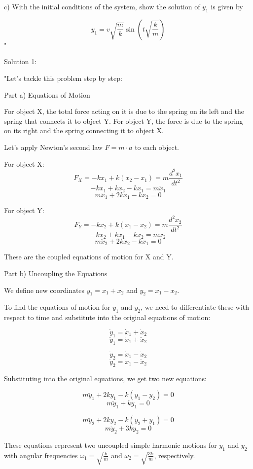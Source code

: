 c) With the initial conditions of the system, show the solution of \( y_{1} \) is given by 
    
\[
y_{1} = v \sqrt{\frac{m}{k}} \sin(t \sqrt{\frac{k}{m}})
\]"

Solution 1:

"Let's tackle this problem step by step:

Part a) Equations of Motion

For object X, the total force acting on it is due to the spring on its left and the spring that connects it to object Y. For object Y, the force is due to the spring on its right and the spring connecting it to object X. 

Let's apply Newton's second law \( F = m \cdot a \) to each object.

For object X:
\[ F_{X} = -kx_{1} + k(x_{2} - x_{1}) = m \frac{d^{2}x_{1}}{dt^{2}} \]
\[ -kx_{1} + kx_{2} - kx_{1} = m \ddot{x}_{1} \]
\[ m \ddot{x}_{1} + 2kx_{1} - kx_{2} = 0 \]

For object Y:
\[ F_{Y} = -kx_{2} + k(x_{1} - x_{2}) = m \frac{d^{2}x_{2}}{dt^{2}} \]
\[ -kx_{2} + kx_{1} - kx_{2} = m \ddot{x}_{2} \]
\[ m \ddot{x}_{2} + 2kx_{2} - kx_{1} = 0 \]

These are the coupled equations of motion for X and Y.

Part b) Uncoupling the Equations

We define new coordinates \( y_{1} = x_{1} + x_{2} \) and \( y_{2} = x_{1} - x_{2} \).

To find the equations of motion for \( y_{1} \) and \( y_{2} \), we need to differentiate these with respect to time and substitute into the original equations of motion:

\[ \dot{y}_{1} = \dot{x}_{1} + \dot{x}_{2} \]
\[ \ddot{y}_{1} = \ddot{x}_{1} + \ddot{x}_{2} \]

\[ \dot{y}_{2} = \dot{x}_{1} - \dot{x}_{2} \]
\[ \ddot{y}_{2} = \ddot{x}_{1} - \ddot{x}_{2} \]

Substituting into the original equations, we get two new equations:

\[ m \ddot{y}_{1} + 2ky_{1} - k(y_{1} - y_{2}) = 0 \]
\[ m \ddot{y}_{1} + ky_{1} = 0 \]

\[ m \ddot{y}_{2} + 2ky_{2} - k(y_{2} + y_{1}) = 0 \]
\[ m \ddot{y}_{2} + 3ky_{2} = 0 \]

These equations represent two uncoupled simple harmonic motions for \( y_{1} \) and \( y_{2} \) with angular frequencies \( \omega_{1} = \sqrt{\frac{k}{m}} \) and \( \omega_{2} = \sqrt{\frac{3k}{m}} \), respectively.


